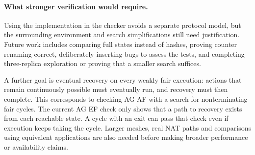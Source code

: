 \paragraph{What stronger verification would require.}
Using the implementation in the checker avoids a separate protocol
model, but the surrounding environment and search simplifications still
need justification. Future work includes comparing full states instead
of hashes, proving counter renaming correct, deliberately inserting bugs
to assess the tests, and completing three-replica exploration or proving
that a smaller search suffices.

A further goal is eventual recovery on every weakly fair execution:
actions that remain continuously possible must eventually run, and recovery must
then complete. This corresponds to checking AG AF with a search for
nonterminating fair cycles. The current AG EF check only shows that a
path to recovery exists from each reachable state. A cycle with an exit
can pass that check even if execution keeps taking the cycle.
Larger meshes, real NAT paths and comparisons using equivalent
applications are also needed before making broader performance or
availability claims.
